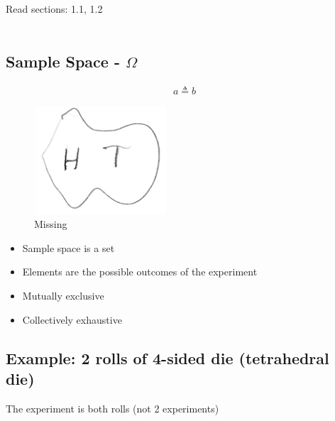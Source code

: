 
 Read sections: 1.1, 1.2\\
\\


\subsection{Sample Space - \texorpdfstring{$\Omega$}{Omega}}

\begin{align*}
    a \triangleq b
\end{align*}

\begin{figure}[h]
\centering
\includegraphics[width=5cm, height=4cm]{images/L01/IMG_1_1455.jpeg}
\caption{Missing}
\end{figure}

\begin{itemize}
    \item Sample space is a set
    \item Elements are the possible outcomes of the experiment
    \item Mutually exclusive
    \item Collectively exhaustive
\end{itemize}

\subsection{Example: 2 rolls of 4-sided die (tetrahedral die)}

{}
The experiment is both rolls (not 2 experiments)

